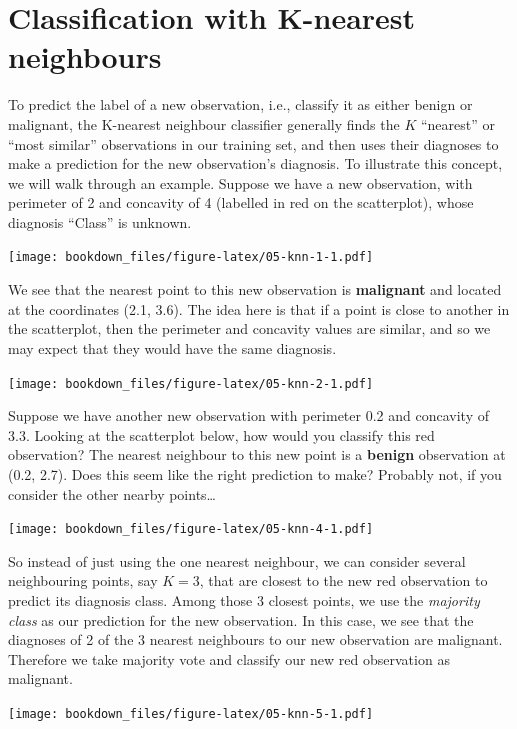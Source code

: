 \documentclass[
]{krantz}
\begin{document}
\hypertarget{classification-with-k-nearest-neighbours}{%
\section{Classification with K-nearest neighbours}\label{classification-with-k-nearest-neighbours}}

To predict the label of a new observation, i.e., classify it as either benign
or malignant, the K-nearest neighbour classifier generally finds the \(K\)
``nearest'' or ``most similar'' observations in our training set, and then uses
their diagnoses to make a prediction for the new observation's diagnosis. To
illustrate this concept, we will walk through an example. Suppose we have a
new observation, with perimeter of 2 and concavity of 4
(labelled in red on the scatterplot), whose diagnosis ``Class'' is
unknown.

\texttt{[image: bookdown\_files/figure-latex/05-knn-1-1.pdf]}

We see that the nearest point to this new observation is \textbf{malignant} and
located at the coordinates (2.1, 3.6). The idea here is that if a point is close to another in the scatterplot,
then the perimeter and concavity values are similar, and so we may expect that
they would have the same diagnosis.

\texttt{[image: bookdown\_files/figure-latex/05-knn-2-1.pdf]}

Suppose we have another new observation with perimeter 0.2 and
concavity of 3.3. Looking at the scatterplot below, how would you
classify this red observation? The nearest neighbour to this new point is a
\textbf{benign} observation at (0.2, 2.7).
Does this seem like the right prediction to make? Probably not, if you consider
the other nearby points\ldots{}

\texttt{[image: bookdown\_files/figure-latex/05-knn-4-1.pdf]}

So instead of just using the one nearest neighbour, we can consider several
neighbouring points, say \(K = 3\), that are closest to the new red observation
to predict its diagnosis class. Among those 3 closest points, we use the
\emph{majority class} as our prediction for the new observation. In this case, we
see that the diagnoses of 2 of the 3 nearest neighbours to our new observation
are malignant. Therefore we take majority vote and classify our new red
observation as malignant.

\texttt{[image: bookdown\_files/figure-latex/05-knn-5-1.pdf]}
\end{document}
